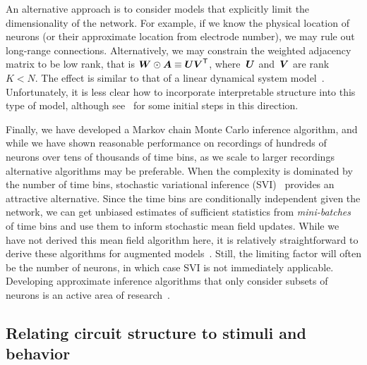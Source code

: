\sloppy
An alternative approach is to consider models that explicitly limit 
the dimensionality of the network. For example, if we know the 
physical location of neurons (or their approximate location from 
electrode number), we may rule out long-range connections. 
Alternatively, we may constrain the weighted adjacency matrix to be 
low rank, that is ${\boldsymbol{W} \odot \boldsymbol{A} \equiv \boldsymbol{U} \boldsymbol{V}^{\mathsf{T}}}$, where~$\boldsymbol{U}$
and~$\boldsymbol{V}$ are rank~${K < N}$. The effect is similar to that of 
a linear dynamical system model~\cite{paninski2010new, macke2011empirical}. 
Unfortunately, it is less clear how to incorporate interpretable 
structure into this type of model, although see~\citet{buesing2014clustered}
for some initial steps in this direction.


Finally, we have developed a Markov chain Monte Carlo inference algorithm,
and while we have shown reasonable performance on recordings of 
hundreds of neurons over tens of thousands of time bins, as we scale 
to larger recordings alternative algorithms may be preferable. 
When the complexity is dominated by the number of time bins, 
stochastic variational inference (SVI)~\cite{Hoffman13} provides 
an attractive alternative. Since the time bins are conditionally 
independent given the network, we can get unbiased estimates of 
sufficient statistics from \textit{mini-batches} of time bins
and use them to inform stochastic mean field updates. 
While we have not derived this mean field algorithm here, it is 
relatively straightforward to derive these algorithms for 
\polyagamma augmented models~\cite{Pillow2012, Zhou2012}. 
Still, the limiting factor will often be the number of neurons, 
in which case SVI is not immediately applicable. Developing 
approximate inference algorithms that only consider subsets of neurons is 
an active area of research~\cite{soudry2015efficient}. 

\subsection{Relating circuit structure to stimuli and behavior}

